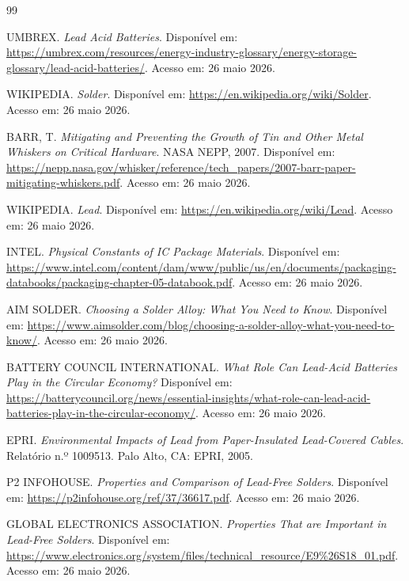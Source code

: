 \documentclass[12pt]{article}
\begin{document}
\newpage
\begin{thebibliography}{99}
\small

UMBREX. \textit{Lead Acid Batteries}. Disponível em:
\url{https://umbrex.com/resources/energy-industry-glossary/energy-storage-glossary/lead-acid-batteries/}.
Acesso em: 26 maio 2026.

WIKIPEDIA. \textit{Solder}. Disponível em: \url{https://en.wikipedia.org/wiki/Solder}.
Acesso em: 26 maio 2026.

BARR, T. \textit{Mitigating and Preventing the Growth of Tin and Other Metal Whiskers on
Critical Hardware}. NASA NEPP, 2007. Disponível em:
\url{https://nepp.nasa.gov/whisker/reference/tech_papers/2007-barr-paper-mitigating-whiskers.pdf}.
Acesso em: 26 maio 2026.

WIKIPEDIA. \textit{Lead}. Disponível em: \url{https://en.wikipedia.org/wiki/Lead}.
Acesso em: 26 maio 2026.

INTEL. \textit{Physical Constants of IC Package Materials}. Disponível em:
\url{https://www.intel.com/content/dam/www/public/us/en/documents/packaging-databooks/packaging-chapter-05-databook.pdf}.
Acesso em: 26 maio 2026.

AIM SOLDER. \textit{Choosing a Solder Alloy: What You Need to Know}. Disponível em:
\url{https://www.aimsolder.com/blog/choosing-a-solder-alloy-what-you-need-to-know/}.
Acesso em: 26 maio 2026.

BATTERY COUNCIL INTERNATIONAL. \textit{What Role Can Lead-Acid Batteries Play in the
Circular Economy?} Disponível em:
\url{https://batterycouncil.org/news/essential-insights/what-role-can-lead-acid-batteries-play-in-the-circular-economy/}.
Acesso em: 26 maio 2026.

EPRI. \textit{Environmental Impacts of Lead from Paper-Insulated Lead-Covered Cables}.
Relatório n.º 1009513. Palo Alto, CA: EPRI, 2005.

P2 INFOHOUSE. \textit{Properties and Comparison of Lead-Free Solders}. Disponível em:
\url{https://p2infohouse.org/ref/37/36617.pdf}. Acesso em: 26 maio 2026.

GLOBAL ELECTRONICS ASSOCIATION. \textit{Properties That are Important in Lead-Free
Solders}. Disponível em:
\url{https://www.electronics.org/system/files/technical_resource/E9%26S18_01.pdf}.
Acesso em: 26 maio 2026.


\end{thebibliography}
\end{document}

